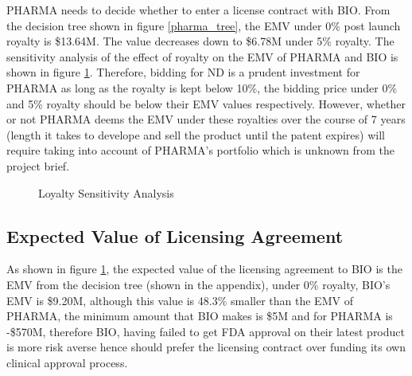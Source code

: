 \documentclass[journal]{IEEEtran}
\begin{document}
PHARMA needs to decide whether to enter a license contract with BIO. From the decision tree shown in figure \ref{pharma_tree}, the EMV under 0\% post launch royalty is \$13.64M. The value decreases down to \$6.78M under 5\% royalty. The sensitivity analysis of the effect of royalty on the EMV of PHARMA and BIO is shown in figure \ref{fig:loys}. Therefore, bidding for ND is a prudent investment for PHARMA as long as the royalty is kept below 10\%, the bidding price under 0\% and 5\% royalty should be below their EMV values respectively. However, whether or not PHARMA deems the EMV under these royalties over the course of 7 years (length it takes to develope and sell the product until the patent expires) will require taking into account of PHARMA's portfolio which is unknown from the project brief.
\begin{figure}[H]
    \centering
    \caption{Loyalty Sensitivity Analysis}
    \label{fig:loys}
\end{figure}


\subsection{Expected Value of Licensing Agreement}
As shown in figure \ref{fig:loys}, the expected value of the licensing agreement to BIO is the EMV from the decision tree (shown in the appendix), under 0\% royalty, BIO's EMV is \$9.20M, although this value is 48.3\% smaller than the EMV of PHARMA, the minimum amount that BIO makes is \$5M and for PHARMA is -\$570M, therefore BIO, having failed to get FDA approval on their latest product is more risk averse hence should prefer the licensing contract over funding its own clinical approval process.
\end{document}
